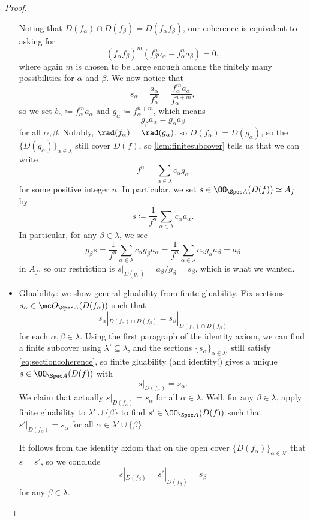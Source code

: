 \documentclass[../notes.tex]{subfiles}
\begin{document}
\begin{proof}
\begin{itemize}
		Noting that $D(f_\alpha)\cap D(f_\beta)=D(f_\alpha f_\beta)$, our coherence is equivalent to asking for
		\[(f_\alpha f_\beta)^m\left(f_\beta^na_\alpha-f_\alpha^na_\beta\right)=0,\]
		where again $m$ is chosen to be large enough among the finitely many possibilities for $\alpha$ and $\beta$. We now notice that
		\[s_\alpha=\frac{a_\alpha}{f_\alpha^n}=\frac{f_\alpha^ma_\alpha}{f_\alpha^{n+m}},\]
		so we set $b_\alpha\coloneqq f_\alpha^ma_\alpha$ and $g_\alpha\coloneqq f_\alpha^{n+m}$, which means
		\[g_\beta a_\alpha=g_\alpha a_\beta\]
		for all $\alpha,\beta$. Notably, $\rad(f_\alpha)=\rad(g_\alpha)$, so $D(f_\alpha)=D(g_\alpha)$, so the $\{D(g_\alpha)\}_{\alpha\in\lambda}$ still cover $D(f)$, so \autoref{lem:finitesubcover} tells us that we can write
		\[f^n=\sum_{\alpha\in\lambda}c_\alpha g_\alpha\]
		for some positive integer $n$. In particular, we set $s\in\OO_{\Spec A}(D(f))\simeq A_f$ by
		\[s\coloneqq\frac1{f^n}\sum_{\alpha\in\lambda}c_\alpha a_\alpha.\]
		In particular, for any $\beta\in\lambda$, we see
		\[g_\beta s=\frac1{f^n}\sum_{\alpha\in\lambda}c_\alpha g_\beta a_\alpha=\frac1{f^n}\sum_{\alpha\in\lambda}c_\alpha g_\alpha a_\beta=a_\beta\]
		in $A_f$, so our restriction is $s|_{D(g_\beta)}=a_\beta/g_\beta=s_\beta$, which is what we wanted.

		\item Gluability: we show general gluability from finite gluability. Fix sections $s_\alpha\in\mc O_{\Spec A}(D(f_\alpha))$ such that
		\begin{equation}
			s_\alpha|_{D(f_\alpha)\cap D(f_\beta)}=s_\beta|_{D(f_\alpha)\cap D(f_\beta)} \label{eq:sectioncoherence}
		\end{equation}
		for each $\alpha,\beta\in\lambda$. Using the first paragraph of the identity axiom, we can find a finite subcover using $\lambda'\subseteq\lambda$, and the sections $\{s_\alpha\}_{\alpha\in\lambda'}$ still satisfy \autoref{eq:sectioncoherence}, so finite gluability (and identity!) gives a unique $s\in\OO_{\Spec A}(D(f))$ with
		\[s|_{D(f_\alpha)}=s_\alpha.\]
		We claim that actually $s|_{D(f_\alpha)}=s_\alpha$ for all $\alpha\in\lambda$. Well, for any $\beta\in\lambda$, apply finite gluability to $\lambda'\cup\{\beta\}$ to find $s'\in\OO_{\Spec A}(D(f))$ such that $s'|_{D(f_\alpha)}=s_\alpha$ for all $\alpha\in\lambda'\cup\{\beta\}$.
		
		It follows from the identity axiom that on the open cover $\{D(f_\alpha)\}_{\alpha\in\lambda'}$ that $s=s'$, so we conclude
		\[s|_{D(f_\beta)}=s'|_{D(f_\beta)}=s_\beta\]
		for any $\beta\in\lambda$.
		\qedhere
	\end{itemize}
\end{proof}
\end{document}
